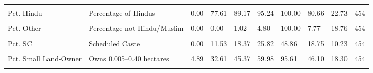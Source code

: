 \documentclass[
]{article}
\begin{document}
\begin{landscape}
\begin{ThreePartTable}
\begin{longtable}[t]{>{\raggedright\arraybackslash}p{4cm}>{\raggedright\arraybackslash}p{6cm}lllllllr}
\hspace{1em}\cellcolor{gray!10}{Pct. Female Head} & \cellcolor{gray!10}{Percentage of households with a female head} & \cellcolor{gray!10}{12.21} & \cellcolor{gray!10}{17.56} & \cellcolor{gray!10}{19.32} & \cellcolor{gray!10}{21.14} & \cellcolor{gray!10}{28.98} & \cellcolor{gray!10}{19.49} & \cellcolor{gray!10}{2.75} & \cellcolor{gray!10}{454}\\
\hspace{1em}Pct. Hindu & Percentage of Hindus & 0.00 & 77.61 & 89.17 & 95.24 & 100.00 & 80.66 & 22.73 & 454\\
\hspace{1em}\cellcolor{gray!10}{Pct. Muslim} & \cellcolor{gray!10}{Percentage of Muslims} & \cellcolor{gray!10}{0.00} & \cellcolor{gray!10}{2.09} & \cellcolor{gray!10}{6.77} & \cellcolor{gray!10}{13.52} & \cellcolor{gray!10}{100.00} & \cellcolor{gray!10}{11.57} & \cellcolor{gray!10}{16.46} & \cellcolor{gray!10}{454}\\
\hspace{1em}Pct. Other & Percentage not Hindu/Muslim & 0.00 & 0.00 & 1.02 & 4.80 & 100.00 & 7.77 & 18.76 & 454\\
\hspace{1em}\cellcolor{gray!10}{Pct. ST} & \cellcolor{gray!10}{Scheduled Tribe} & \cellcolor{gray!10}{0.00} & \cellcolor{gray!10}{0.00} & \cellcolor{gray!10}{2.02} & \cellcolor{gray!10}{11.05} & \cellcolor{gray!10}{100.00} & \cellcolor{gray!10}{11.79} & \cellcolor{gray!10}{21.43} & \cellcolor{gray!10}{454}\\
\hspace{1em}Pct. SC & Scheduled Caste & 0.00 & 11.53 & 18.37 & 25.82 & 48.86 & 18.75 & 10.23 & 454\\
\hspace{1em}\cellcolor{gray!10}{Pct. OBC} & \cellcolor{gray!10}{Other Backward Class} & \cellcolor{gray!10}{0.00} & \cellcolor{gray!10}{22.18} & \cellcolor{gray!10}{44.93} & \cellcolor{gray!10}{60.73} & \cellcolor{gray!10}{88.32} & \cellcolor{gray!10}{42.10} & \cellcolor{gray!10}{22.76} & \cellcolor{gray!10}{454}\\
\hspace{1em}Pct. Small Land-Owner & Owns 0.005–0.40 hectares & 4.89 & 32.61 & 45.37 & 59.98 & 95.61 & 46.10 & 18.30 & 454\\
\hspace{1em}\cellcolor{gray!10}{Pct. Med. Land-Owner} & \cellcolor{gray!10}{Owns 0.41–3.00 hectares} & \cellcolor{gray!10}{0.00} & \cellcolor{gray!10}{19.15} & \cellcolor{gray!10}{30.49} & \cellcolor{gray!10}{42.93} & \cellcolor{gray!10}{94.64} & \cellcolor{gray!10}{32.22} & \cellcolor{gray!10}{17.26} & \cellcolor{gray!10}{454}\\

\end{longtable}
\end{ThreePartTable}
\end{landscape}
\end{document}
